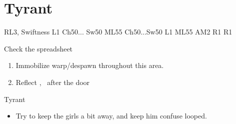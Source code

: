 \chapter{Tyrant}

\begin{liscense}
	RL3, Swiftness
	L1					Ch50... Sw50
	ML55
	Ch50...Sw50	L1
	ML55
	AM2				R1	R1

	Check the spreadsheet
\end{liscense}
\begin{gambit}
	\begin{itemize}
	\end{itemize}
\end{gambit}
\begin{enumerate}
	\item Immobilize warp/despawn throughout this area.
	\item Reflect \ashe, \penelo\ after the door
\end{enumerate}
\begin{battle}{Tyrant}
	\begin{itemize}
		\penelof Dispel
		\vaanf Once it's charged a bit, start spamming Confuse
		\item Try to keep the girls a bit away, and keep him confuse looped.
	\end{itemize}
\end{battle}